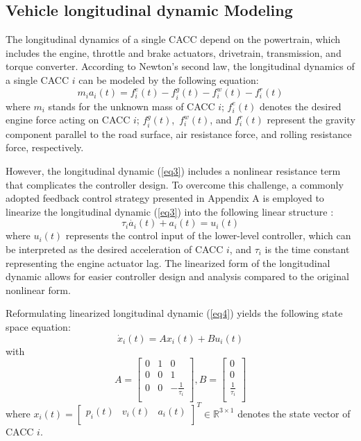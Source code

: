 \documentclass[a4paper]{cas-sc}
\begin{document}
\subsection{Vehicle longitudinal dynamic Modeling}
\label{Section 3.1}

The longitudinal dynamics of a single CACC depend on the powertrain, which includes the engine, throttle and brake actuators, drivetrain, transmission, and torque converter. According to Newton's second law, the longitudinal dynamics of a single CACC $i$ can be modeled by the following equation:
\begin{equation}
m_ia_i(t)=f_i^e(t)-f_i^g(t)-f_i^w(t)-f_i^r(t)   
\label{eq3}                   
\end{equation}
where $m_i$ stands for the unknown mass of CACC $i$; $f_i^e(t)$ denotes the desired engine force acting on CACC $i$; $f_i^g(t)$,\ $f_i^w(t)$, and $f_i^r(t)$ represent the gravity component parallel to the road surface, air resistance force, and rolling resistance force, respectively.

However, the longitudinal dynamic (\ref{eq3}) includes a nonlinear resistance term that complicates the controller design. To overcome this challenge, a commonly adopted feedback control strategy presented in Appendix A is employed to linearize the longitudinal dynamic (\ref{eq3}) into the following linear structure \citep{wang2018infrastructure}:
\begin{equation}
\tau_i\dot{a_i}\left(t\right)+a_i\left(t\right)=u_i(t)       \label{eq4}                   
\end{equation}
where $u_i(t)$ represents the control input of the lower-level controller, which can be interpreted as the desired acceleration of CACC $i$, and $\tau_i$ is the time constant representing the engine actuator lag. The linearized form of the longitudinal dynamic allows for easier controller design and analysis compared to the original nonlinear form.




Reformulating linearized longitudinal dynamic (\ref{eq4}) yields the following state space equation:
\begin{equation}
{\dot{x}}_i\left(t\right)=Ax_i\left(t\right)+Bu_i\left(t\right)
\label{eq5}  
\end{equation}
with 
\begin{equation*}
A=\left[\begin{matrix}0&1&0\\0&0&1\\0&0&-\frac{1}{\tau_i}\\\end{matrix}\right], B=\left[\begin{matrix}0\\0\\\frac{1}{\tau_i}\\\end{matrix}\right] 
\end{equation*}
where $x_i\left(t\right)=\left[\begin{matrix}p_i\left(t\right)&v_i\left(t\right)&a_i\left(t\right)\\\end{matrix}\right]^T\in\mathbb{R}^{3\times1}$ denotes the state vector of CACC $i$.
\end{document}
